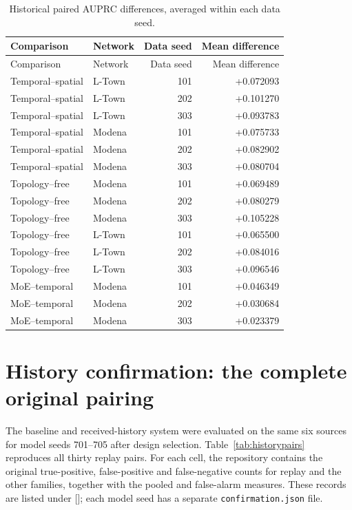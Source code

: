 \begin{longtable}{@{}llrr@{}}
\caption[Data-seed means of historical effects]{Historical paired AUPRC differences, averaged within each data seed.}\label{tab:seedcontrasts}\\
\toprule Comparison & Network & Data seed & Mean difference\\\midrule\endfirsthead
\toprule Comparison & Network & Data seed & Mean difference\\\midrule\endhead
Temporal--spatial & L-Town & 101 & +0.072093\\
Temporal--spatial & L-Town & 202 & +0.101270\\
Temporal--spatial & L-Town & 303 & +0.093783\\
Temporal--spatial & Modena & 101 & +0.075733\\
Temporal--spatial & Modena & 202 & +0.082902\\
Temporal--spatial & Modena & 303 & +0.080704\\
Topology--free & Modena & 101 & +0.069489\\
Topology--free & Modena & 202 & +0.080279\\
Topology--free & Modena & 303 & +0.105228\\
Topology--free & L-Town & 101 & +0.065500\\
Topology--free & L-Town & 202 & +0.084016\\
Topology--free & L-Town & 303 & +0.096546\\
MoE--temporal & Modena & 101 & +0.046349\\
MoE--temporal & Modena & 202 & +0.030684\\
MoE--temporal & Modena & 303 & +0.023379\\
\bottomrule\end{longtable}

\section{History confirmation: the complete original pairing}
The baseline and received-history system were evaluated on the same six sources for model seeds 701--705 after design selection. Table~\ref{tab:historypairs} reproduces all thirty replay pairs. For each cell, the repository contains the original true-positive, false-positive and false-negative counts for replay and the other families, together with the pooled and false-alarm measures. These records are listed under []; each model seed has a separate \texttt{confirmation.json} file.

